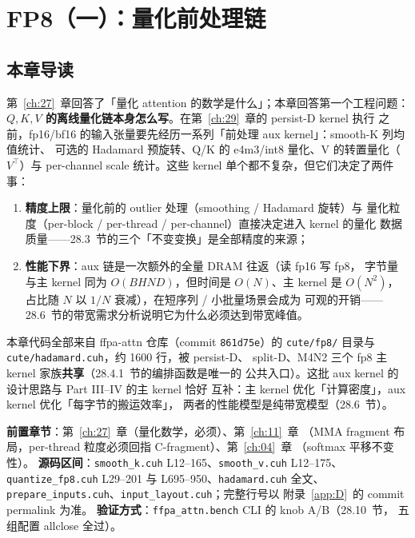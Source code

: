 \chapter{FP8（一）：量化前处理链}\label{ch:28}

\section{本章导读}

第~\ref{ch:27}~章回答了「量化 attention 的数学是什么」；本章回答第一个工程问题：
\textbf{$Q,K,V$ 的离线量化链本身怎么写}。在第~\ref{ch:29}~章的 persist-D kernel 执行
之前，fp16/bf16 的输入张量要先经历一系列「前处理 aux kernel」：smooth-K 列均值统计、
可选的 Hadamard 预旋转、Q/K 的 e4m3/int8 量化、V 的转置量化（$V^{\top}$）与
per-channel scale 统计。这些 kernel 单个都不复杂，但它们决定了两件事：
\begin{enumerate}[itemsep=0pt,topsep=2pt]
  \item \textbf{精度上限}：量化前的 outlier 处理（smoothing / Hadamard 旋转）与
        量化粒度（per-block / per-thread / per-channel）直接决定进入 kernel 的量化
        数据质量——28.3~节的三个「不变变换」是全部精度的来源；
  \item \textbf{性能下界}：aux 链是一次额外的全量 DRAM 往返（读 fp16 写 fp8，
        字节量与主 kernel 同为 $O(BHND)$，但时间是 $O(N)$、主 kernel 是
        $O(N^2)$，占比随 $N$ 以 $1/N$ 衰减），在短序列 / 小批量场景会成为
        可观的开销——28.6~节的带宽需求分析说明它为什么必须达到带宽峰值。
\end{enumerate}

本章代码全部来自 ffpa-attn 仓库（commit \texttt{861d75e}）的
\texttt{cute/fp8/} 目录与 \texttt{cute/hadamard.cuh}，约 1600 行，被 persist-D、
split-D、M4N2 三个 fp8 主 kernel 家族\textbf{共享}（28.4.1~节的编排函数是唯一的
公共入口）。这批 aux kernel 的设计思路与 Part III--IV 的主 kernel 恰好
互补：主 kernel 优化「计算密度」，aux kernel 优化「每字节的搬运效率」，
两者的性能模型是纯带宽模型（28.6~节）。

\textbf{前置章节}：第~\ref{ch:27}~章（量化数学，必须）、第~\ref{ch:11}~章
（MMA fragment 布局，per-thread 粒度必须回指 C-fragment）、第~\ref{ch:04}~章
（softmax 平移不变性）。
\textbf{源码区间}：\texttt{smooth\_k.cuh} L12--165、\texttt{smooth\_v.cuh}
L12--175、\texttt{quantize\_fp8.cuh} L29--201 与 L695--950、\texttt{hadamard.cuh}
全文、\texttt{prepare\_inputs.cuh}、\texttt{input\_layout.cuh}；完整行号以
附录~\ref{app:D}~的 commit permalink 为准。
\textbf{验证方式}：\texttt{ffpa\_attn.bench} CLI 的 knob A/B（28.10~节，
五组配置 allclose 全过）。


